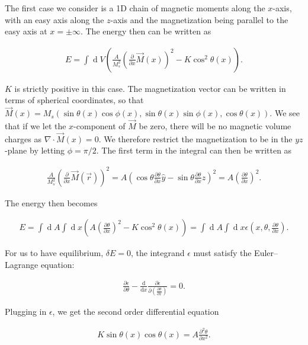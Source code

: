 \documentclass[1p]{elsarticle}		%
\renewcommand{\d}[1]{\ensuremath{\operatorname{d}\!{#1}}}
\numberwithin{equation}{section}
\begin{document}
The first case we consider is a 1D chain of magnetic moments along the $x$-axis, with an easy axis along the $z$-axis and the magnetization being parallel to the easy axis at $x = \pm \infty$. The energy then can be written as

\begin{align}
\label{eq:BlochEnergy}
E = \int \d V (\frac{A}{M_s^2}(\frac{\partial}{\partial x}\vec{M}(x))^2 - K \cos ^2 \theta (x)).
\end{align}

$K$ is strictly positive in this case. The magnetization vector can be written in terms of spherical coordinates, so that $\vec{M}(x) = M_s (\sin \theta (x) \cos \phi (x), \sin \theta (x) \sin \phi (x), \cos \theta (x))$. We see that if we let the $x$-component of $\vec{M}$ be zero, there will be no magnetic volume charges as $\nabla \cdot \vec{M}(x) = 0$. We therefore restrict the magnetization to be in the $yz$-plane by letting $\phi = \pi/2$. The first term in the integral can then be written as

\begin{align}
\frac{A}{M_s^2}(\frac{\partial}{\partial x}\vec{M}(\vec{r}))^2 = A(\cos\theta \frac{\partial \theta}{\partial x} \hat{y} - \sin\theta \frac{\partial \theta}{\partial x} \hat{z})^2 = A (\frac{\partial \theta}{\partial x})^2.
\end{align}

The energy then becomes

\begin{align}
E = \int \d A \int \d x (A (\frac{\partial \theta}{\partial x})^2- K \cos ^2 \theta (x)) = \int \d A \int \d x \epsilon(x, \theta, \frac{\partial \theta}{\partial x}).
\end{align}

For us to have equilibrium, $\delta E = 0$, the integrand $\epsilon$ must satisfy the Euler--Lagrange equation:

\begin{align}
\frac{\partial \epsilon}{\partial \theta} - \frac{\textrm{d}}{\textrm{d} x} \frac{\partial \epsilon}{\partial (\frac{\partial \theta}{\partial x})} = 0.
\end{align}

Plugging in $\epsilon$, we get the second order differential equation

\begin{align}
\label{eq:BlochWall}
K\sin \theta (x) \cos \theta (x) = A \frac{\partial^2 \theta}{\partial x^2}.
\end{align} 
\end{document}
